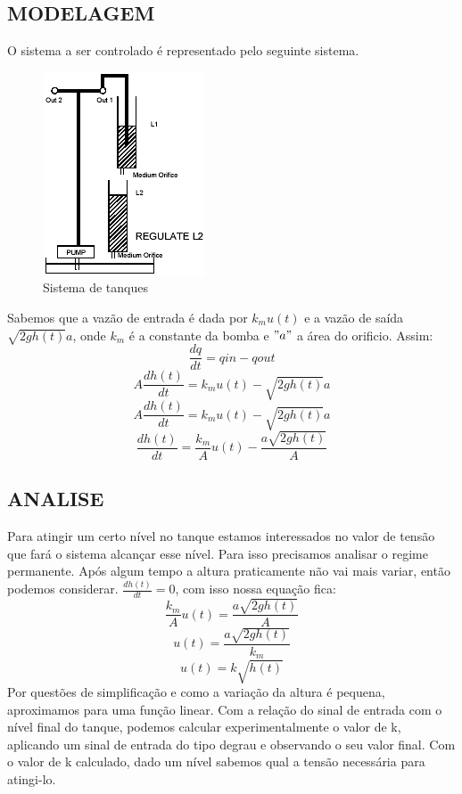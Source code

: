 \documentclass[a4paper,12pt]{article}
\begin{document}
\subsection{MODELAGEM}
\hspace{4ex}O sistema a ser controlado é representado pelo seguinte sistema.
\begin{figure}[h]
\includegraphics[scale=1]{tanques.png}
\caption{Sistema de tanques}
\label{fig:tanques}
\end{figure}

\hspace{4ex}Sabemos que a vazão de entrada é dada por $ k_mu(t) $ e a vazão de saída $ \sqrt{2gh(t)}a $, onde $k_m$ é a constante da bomba e $"a"$ a área do orificio. Assim: 
\[ \frac{dq}{dt}=qin-qout\]
\[ A\frac{dh(t)}{dt}=k_mu(t)-\sqrt{2gh(t)}a \]
\[ A\frac{dh(t)}{dt}=k_mu(t)-\sqrt{2gh(t)}a \]
\[ \frac{dh(t)}{dt}= \frac{k_m}{A}u(t)- \frac{a\sqrt{2gh(t)}}{A} \]

\subsection{ANALISE}
\hspace{4ex}Para atingir um certo nível no tanque estamos interessados no valor de tensão que fará o sistema alcançar esse nível. Para isso precisamos analisar o regime permanente. Após algum tempo a altura praticamente não vai mais variar, então podemos considerar.  $\frac{dh(t)}{dt}=0 $, com isso nossa equação fica:
\[ \frac{k_m}{A}u(t)= \frac{a\sqrt{2gh(t)}}{A} \]
\[ u(t)=  \frac{a\sqrt{2gh(t)}}{k_m}\]
\begin{equation}\label{eq:1}
u(t)=k\sqrt{h(t)}
\end{equation}
\hspace{4ex}Por questões de simplificação e como a variação da altura é pequena, aproximamos para uma função linear. Com a relação do sinal de entrada com o nível final do tanque, podemos calcular experimentalmente o valor de k, aplicando um sinal de entrada do tipo degrau e observando o seu valor final.
Com o valor de k calculado, dado um nível sabemos qual a tensão necessária para atingi-lo.
\end{document}
